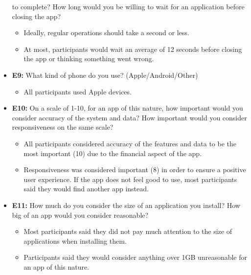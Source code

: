 \documentclass[12pt]{article}
\begin{document}
\begin{itemize}
  to complete? How long would you be willing to wait for an application before closing the app?
    \begin{itemize}
      \item Ideally, regular operations should take a second or less.
      \item At most, participants would wait an average of 12 seconds before closing the app or
      thinking something went wrong.
    \end{itemize}
  \item \textbf{E9:} What kind of phone do you use? (Apple/Android/Other)
    \begin{itemize}
      \item All participants used Apple devices.
    \end{itemize}
  \item \textbf{E10:} On a scale of 1-10, for an app of this nature, how important would you consider accuracy
  of the system and data? How important would you consider responsiveness on the same scale?
    \begin{itemize}
      \item All participants considered accuracy of the features and data to be the most important (10) due
      to the financial aspect of the app.
      \item Responsiveness was considered important (8) in order to ensure a positive user experience. If the
      app does not feel good to use, most participants said they would find another app instead.
    \end{itemize}
  \item \textbf{E11:} How much do you consider the size of an application you install? How big of an app would you
  consider reasonable?
    \begin{itemize}
      \item Most participants said they did not pay much attention to the size of applications when installing
      them.
      \item Participants said they would consider anything over 1GB unreasonable for an app of this nature.
    \end{itemize}
\end{itemize}
\end{document}
